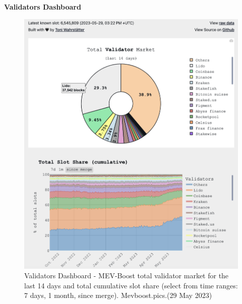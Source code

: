 \documentclass[UTF8]{article}
\begin{document}
{\clearpage
\textbf{Validators Dashboard} \\
\begin{figure}[htbp]
\begin{center}
\includegraphics[width=0.85\linewidth]{images/mevvalidator1}
\caption{Validators Dashboard - MEV-Boost total validator market for the last 14 days  and total cumulative slot share (select from time ranges: 7 days, 1 month, since merge). Mevboost.pics.(29 May 2023)}
\label{fig:mevvalidator1}
\end{center}
\end{figure}

}
\end{document}

